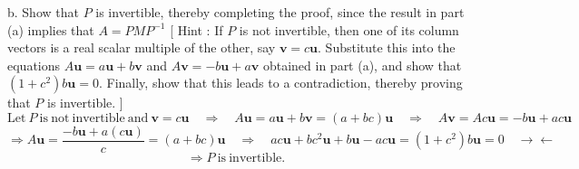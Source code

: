 \documentclass[12pt]{book}
\begin{document}
\begin{CJK}{UTF8}{bsmi}
\begin{minipage}[t]{\dimexpr\linewidth-2em}
b. Show that $P$ is invertible, thereby completing the proof, since the result in part (a) implies that $A=PMP^{-1}$ [ Hint : If $P$ is not invertible, then one of its column vectors is a real scalar multiple of the other, say $\textbf{v}=c\textbf{u}$. Substitute this into the equations $A\textbf{u}=a\textbf{u}+b\textbf{v}$ and $A\textbf{v}=-b\textbf{u}+a\textbf{v}$ obtained in part (a), and show that $(1+c^2 )b\textbf{u}=0$. Finally, show that this leads to a contradiction, thereby proving that $P$ is invertible. ]
\[
\mathrm{Let\ }P \mathrm{\ is\ not\ invertible\ and\ }\textbf{v}=c\textbf{u}\quad\Rightarrow\quad A\textbf{u}=a\textbf{u}+b\textbf{v}=(a+bc)\textbf{u}\quad\Rightarrow\quad A\textbf{v}=Ac\textbf{u}=-b\textbf{u}+ac\textbf{u}
\]
\[
\Rightarrow A\textbf{u}=\frac{-b\textbf{u}+a(c\textbf{u})}{c}=(a+bc)\textbf{u}\quad\Rightarrow\quad ac\textbf{u}+bc^2\textbf{u}+b\textbf{u}-ac\textbf{u}=(1+c^2)b\textbf{u}=0\quad\rightarrow\leftarrow
\]
\[
\Rightarrow P \mathrm{\ is\ invertible.}
\]
\end{minipage}


\end{CJK}
\end{document}
